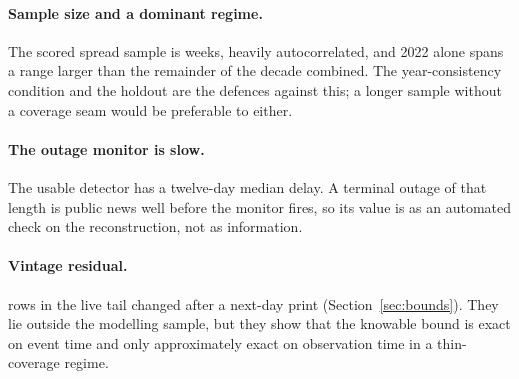 \paragraph{Sample size and a dominant regime.} The scored spread sample is
\bWeeksCov{} weeks, heavily autocorrelated, and 2022 alone spans a range larger than
the remainder of the decade combined. The year-consistency condition and the holdout
are the defences against this; a longer sample without a coverage seam would be
preferable to either.

\paragraph{The outage monitor is slow.} The usable detector has a twelve-day median
delay. A terminal outage of that length is public news well before the monitor
fires, so its value is as an automated check on the reconstruction, not as
information.

\paragraph{Vintage residual.} \vintagePostDay{} rows in the live tail changed after a
next-day print (Section~\ref{sec:bounds}). They lie outside the modelling sample, but
they show that the knowable bound is exact on event time and only approximately
exact on observation time in a thin-coverage regime.
